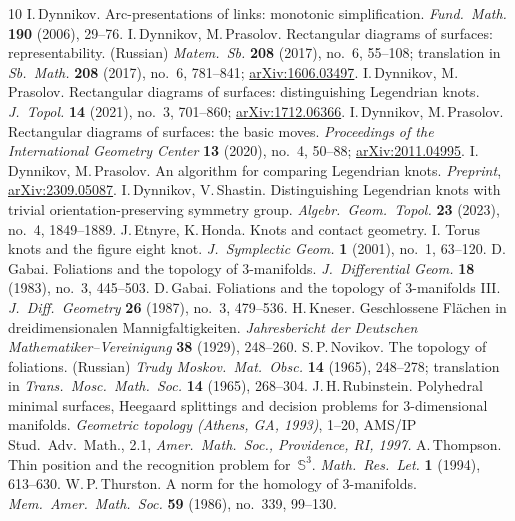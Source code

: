 \documentclass{amsart}
\theoremstyle{theorem}
\theoremstyle{remark}
\theoremstyle{definition}
\numberwithin{equation}{section}
\numberwithin{figure}{section}
\begin{document}
\begin{thebibliography}{10}
I.\,Dynnikov.
Arc-presentations of links: monotonic simplification.
\emph{Fund.\ Math.} {\bf190} (2006), 29--76.
I.\,Dynnikov, M.\,Prasolov.
Rectangular diagrams of surfaces: representability. (Russian)
\emph{Matem.\ Sb.} {\bf208} (2017), no.~6,
55--108; translation in \emph{Sb.\ Math.} {\bf208} (2017), no.~6, 781--841;
\href{https://arxiv.org/abs/1606.03497}{arXiv:1606.03497}.
I.\,Dynnikov, M.\,Prasolov.
Rectangular diagrams of surfaces: distinguishing Legendrian knots.
\emph{J.\ Topol.} {\bf14} (2021), no.~3, 701--860;
\href{https://arxiv.org/abs/1712.06366}{arXiv:1712.06366}.
I.\,Dynnikov, M.\,Prasolov.
Rectangular diagrams of surfaces: the basic moves.
\emph{Proceedings of the International Geometry Center} {\bf13} (2020), no.~4, 50--88;
\href{https://arxiv.org/abs/2011.04995}{arXiv:2011.04995}.
I.\,Dynnikov, M.\,Prasolov.
An algorithm for comparing Legendrian knots.
\emph{Preprint}, \href{https://arxiv.org/abs/2309.05087}{arXiv:2309.05087}.
I.\,Dynnikov, V.\,Shastin.
Distinguishing Legendrian knots with trivial orientation-preserving symmetry group.
\emph{Algebr.\ Geom.\ Topol.} {\bf23} (2023), no.~4, 1849--1889.
J.\,Etnyre, K.\,Honda.
Knots and contact geometry. I. Torus knots and the figure eight knot.
\emph{J.\ Symplectic Geom.} {\bf1} (2001), no.~1, 63--120.
D.\,Gabai.
Foliations and the topology of 3-manifolds.
\emph{J.\ Differential Geom.} {\bf18} (1983), no.~3, 445--503.
D.\,Gabai.
Foliations and the topology of $3$-manifolds III.
\emph{J.\ Diff.\ Geometry} {\bf26} (1987), no.~3, 479--536.
H.\,Kneser.
Geschlossene Fl\"achen in dreidimensionalen Mannigfaltigkeiten.
\emph{Jahresbericht der Deutschen Mathematiker--Vereinigung} {\bf38} (1929), 248--260.
S.\,P.\,Novikov.
The topology of foliations. (Russian)
\emph{Trudy Moskov.\ Mat.\ Obsc.} {\bf14} (1965), 248--278;
translation in
\emph{Trans.\ Mosc.\ Math.\ Soc.} {\bf14} (1965), 268--304.
J.\,H.\,Rubinstein.
Polyhedral minimal surfaces, Heegaard splittings and decision problems for 3-dimensional manifolds.
\emph{Geometric topology \emph(Athens, GA, 1993\emph)}, 1--20,
AMS/IP Stud.\ Adv.\ Math., 2.1, \emph{Amer.\ Math.\ Soc., Providence, RI, 1997.}
A.\,Thompson.
Thin position and the recognition problem for~$\mathbb S^3$.
\emph{Math.\ Res.\ Let.} {\bf1} (1994), 613--630.
W.\,P.\,Thurston.
A norm for the homology of 3-manifolds.
\emph{Mem.\ Amer.\ Math.\ Soc.} {\bf59} (1986), no.~339, 99--130.
\end{thebibliography}
\end{document}
